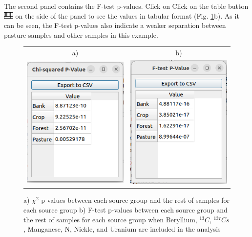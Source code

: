 \documentclass[12pt]{report}
\begin{document}
The second panel contains the F-test p-values. Click on Click on the table button \includegraphics[width=0.5cm]{Figures/table.png} on the side of the panel to see the values in tabular format (Fig. \ref{fig:Chi2-DFA-multiway-for-selected-elements}b). As it can be seen, the F-test p-values also indicate a weaker separation between pasture samples and other samples in this example. 

\begin{figure}[ht]
    \centering
    \begin{tabular}{c c}
        a) & b) \\
        \includegraphics[width=6cm]{Figures/DFA-Multiway-Chi2-p-value-table.png} & \includegraphics[width=6cm]{Figures/DFA-Multiway-F-test-p-value-table.png} 
    \end{tabular}
    
    \caption{a) $\chi^2$ p-values between each source group and the rest of samples for each source group b) F-test p-values between each source group and the rest of samples for each source group when Beryllium, $^{13}C$,  $^{137}Cs$, Manganese, N, Nickle, and Uranium are included in the analysis} 
    \label{fig:Chi2-DFA-multiway-for-selected-elements}
\end{figure}
\FloatBarrier
\end{document}
